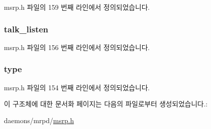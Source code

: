 msrp.\+h 파일의 159 번째 라인에서 정의되었습니다.

\subsubsection[{\texorpdfstring{talk\+\_\+listen}{talk_listen}}]{ talk\+\_\+listen}\hypertarget{structmsrp__attribute_a940e887e9c7477a40dba8b9964d18de2}{}\label{structmsrp__attribute_a940e887e9c7477a40dba8b9964d18de2}


msrp.\+h 파일의 156 번째 라인에서 정의되었습니다.

\subsubsection[{\texorpdfstring{type}{type}}]{ type}\hypertarget{structmsrp__attribute_ad44b615021ed3ccb734fcaf583ef4a03}{}\label{structmsrp__attribute_ad44b615021ed3ccb734fcaf583ef4a03}


msrp.\+h 파일의 154 번째 라인에서 정의되었습니다.



이 구조체에 대한 문서화 페이지는 다음의 파일로부터 생성되었습니다.\+:\begin{DoxyCompactItemize}
\item 
daemons/mrpd/\hyperlink{msrp_8h}{msrp.\+h}\end{DoxyCompactItemize}
